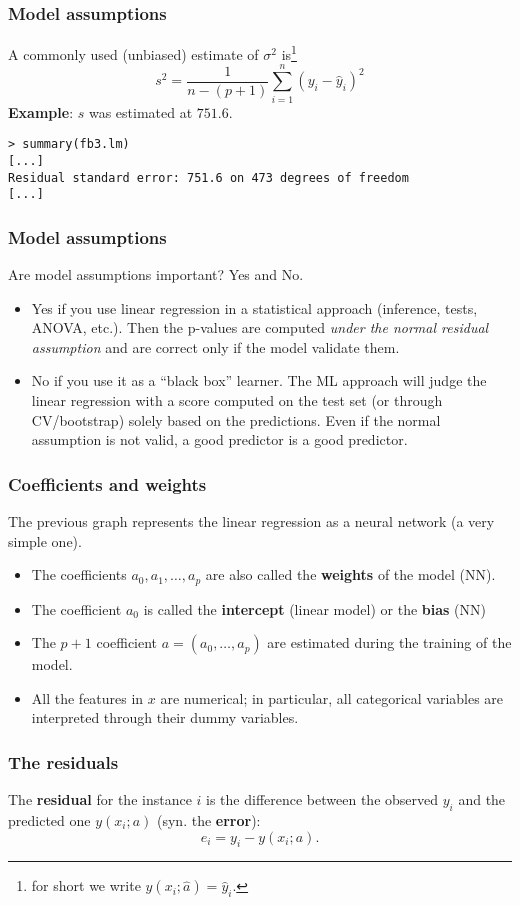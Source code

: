 \begin{frame}[fragile]
\frametitle{Model assumptions}
A commonly used (unbiased) estimate of $\sigma^2$ is\footnote{for short we write $y(x_i;\hat{a})=\hat{y}_i$.} 
$$
s^2 = \frac{1}{n-(p+1)} \sum_{i=1}^n (y_i-\hat{y}_i)^2
$$
{\bf Example}: $s$ was estimated at $751.6$.\\
\scriptsize
\begin{verbatim}
> summary(fb3.lm)
[...]
Residual standard error: 751.6 on 473 degrees of freedom
[...]
\end{verbatim}
\end{frame}
\begin{frame}
\frametitle{Model assumptions}
Are model assumptions important? Yes and No.
\begin{itemize}
\item Yes if you use linear regression in a statistical approach (inference, tests, ANOVA, etc.). Then the p-values are computed {\it under the normal residual assumption} and are correct only if the model validate them.
\item No if you use it as a ``black box'' learner. The ML approach will judge the linear regression with a score computed on the test set (or through CV/bootstrap) solely based on the predictions. Even if the normal assumption is not valid, a good predictor is a good predictor.
\end{itemize}
\end{frame}
\begin{frame}
\frametitle{Coefficients and weights}
The previous graph represents the linear regression as a neural network (a very simple one).
\begin{itemize}
\item The coefficients $a_0, a_1, \ldots, a_p$ are also called the {\bf weights} of the model (NN). 
\item The coefficient $a_0$ is called the {\bf intercept} (linear model) or the {\bf bias} (NN)
\item The $p+1$ coefficient $a=(a_0,\ldots,a_p)$ are estimated during the training of the model.\\
\item All the features in $x$ are numerical; in particular, all categorical variables are interpreted through their dummy variables. 
\end{itemize}
\end{frame}
\begin{frame}
\frametitle{The residuals}
The {\bf residual} for the instance $i$ is the difference between the observed $y_i$ and the predicted one $y(x_i;a)$ (syn. the {\bf error}):
$$
e_i = y_i - y(x_i;a).
$$
\end{frame}

